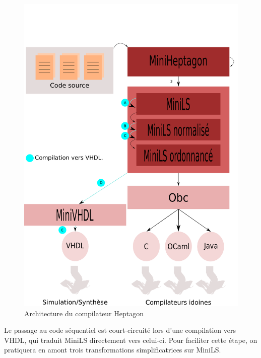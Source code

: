 \documentclass[9pt,a4paper]{article}
\newcommand{\LANG}{Heptagon}
\begin{document}

\begin{figure}[htp]
  \centering
  \includegraphics[scale=0.5]{archi}
  \caption{Architecture du compilateur \LANG{}}
  \label{fig:archi}
\end{figure}

Le passage au code séquentiel est court-circuité lors d'une compilation vers
VHDL, qui traduit MiniLS directement vers celui-ci. Pour faciliter cette étape,
on pratiquera en amont trois transformations simplificatrices sur MiniLS.
\end{document}
